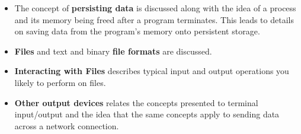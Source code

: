 \begin{enumerate}
\begin{itemize}[noitemsep,nolistsep]
    \item The concept of \textbf{persisting data} is discussed along with the idea of a process and its memory being freed after a program terminates. This leads to details on saving data from the program's memory onto persistent storage.
    \item \textbf{Files} and text and binary \textbf{file formats} are discussed. 
    \item \textbf{Interacting with Files} describes typical input and output operations you likely to perform on files.
    \item \textbf{Other output devices} relates the concepts presented to terminal input/output and the idea that the same concepts apply to sending data across a network connection.
  \end{itemize}
\end{enumerate}

